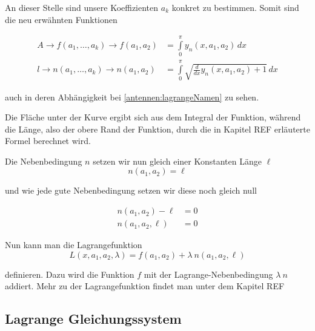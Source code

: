 An dieser Stelle sind unsere Koeffizienten $a_k$ konkret zu bestimmen. 
Somit sind die neu erwähnten Funktionen 

\begin{equation}
\begin{aligned}
	A
	\rightarrow
	f(a_1,\ldots,a_k)
	\rightarrow
	f(a_1,a_2)
	&=
	\int\limits_{0}^{\pi} y_n(x,a_1,a_2)\, dx
	\\
	l
	\rightarrow
	n(a_1,\ldots,a_k)
	\rightarrow
	n(a_1,a_2)
	&=
	\int\limits_{0}^{\pi} \sqrt{\frac{d}{d x} y_n\left(x, a_1, a_2\right)+1}\, dx
\end{aligned}
\label{antennen:lagrangeNamen}
\end{equation}


auch in deren Abhängigkeit bei \eqref{antennen:lagrangeNamen} zu sehen. 

Die Fläche unter der Kurve ergibt sich aus dem Integral der Funktion, 
während die Länge, also der obere Rand der Funktion, durch die in Kapitel REF  %
erläuterte Formel berechnet wird. 

Die Nebenbedingung $n$ setzen wir nun gleich einer Konstanten Länge $\ell$
\begin{equation}
n(a_1, a_2)
=
\ell
\label{antennen:constNebenbed}
\end{equation}

und wie jede gute Nebenbedingung setzen wir diese noch gleich null

\begin{equation}
\begin{aligned}
	n(a_1, a_2) - \ell
	&=
	0
	\\
	n(a_1, a_2, \ell)
	&=
	0
\label{antennen:fertigeNebenbed}
\end{aligned}
\end{equation}

Nun kann man die Lagrangefunktion
\begin{equation}
L(x,a_1,a_2,\lambda)
= 
f(a_1,a_2)+\lambda \: n(a_1,a_2, \ell)
\end{equation}

definieren. Dazu wird die Funktion $f$ mit der Lagrange-Nebenbedingung $\lambda \: n$ addiert. 
Mehr zu der Lagrangefunktion findet man unter dem Kapitel REF %

\subsection{Lagrange Gleichungssystem\label{antennen:lagrangeGLsys}}

